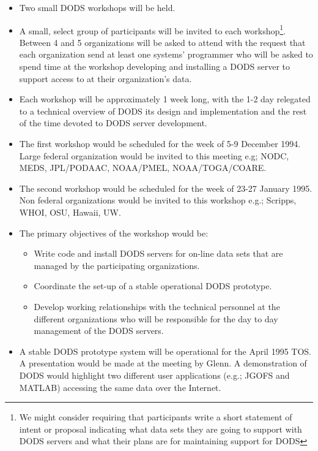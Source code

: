 \begin{itemize}

  \item Two small DODS workshops will be held.
  \item A small, select group of participants will be invited to each
        workshop\footnote{ We might consider requiring that participants
        write a short statement of intent or proposal indicating what data
        sets they are going to support with DODS servers and what their plans
        are for maintaining support for DODS}.  Between 4 and 5 organizations
        will be asked to attend with the request that each organization send
        at least one systems' programmer who will be asked to spend time at
        the workshop developing and installing a DODS server to support
        access to at their organization's data.
  \item Each workshop will be approximately 1 week long, with the 1-2 day
        relegated to a technical overview of DODS its design and
        implementation and the rest of the time devoted to DODS server
        development. 
  \item The first workshop would be scheduled for the week of 5-9 December
        1994.  Large federal organization would be invited to this meeting 
        {e.g; NODC, MEDS, JPL/PODAAC, NOAA/PMEL, NOAA/TOGA/COARE}.
  \item The second workshop would be scheduled for the week of 23-27 January
        1995.  Non federal organizations would be invited to this workshop 
        {e.g.; Scripps, WHOI, OSU, Hawaii, UW}.
  \item The primary objectives of the workshop would be:
  \begin{itemize}
	\item Write code and install DODS servers for on-line data sets that
	      are managed by the participating organizations.
	\item Coordinate the set-up of a stable operational DODS prototype.
	\item Develop working relationships with the technical personnel at
	      the different organizations who will be responsible for the day
	      to day management of the DODS servers.
  \end{itemize}
  \item A stable DODS prototype system will be operational for the April 1995
        TOS.  A presentation would be made at the meeting by Glenn.  A
        demonstration of DODS would highlight two different user applications
        (e.g.; JGOFS and MATLAB) accessing the same data over the Internet.
\end{itemize}

